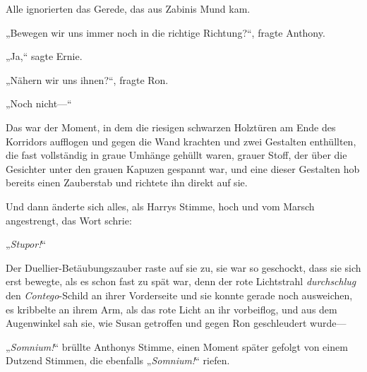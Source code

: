 Alle ignorierten das Gerede, das aus Zabinis Mund kam.

„Bewegen wir uns immer noch in die richtige Richtung?“, fragte Anthony.

„Ja,“ sagte Ernie.

„Nähern wir uns ihnen?“, fragte Ron.

„Noch nicht—“

Das war der Moment, in dem die riesigen schwarzen Holztüren am Ende des Korridors aufflogen und gegen die Wand krachten und zwei Gestalten enthüllten, die fast vollständig in graue Umhänge gehüllt waren, grauer Stoff, der über die Gesichter unter den grauen Kapuzen gespannt war, und eine dieser Gestalten hob bereits einen Zauberstab und richtete ihn direkt auf sie.

Und dann änderte sich alles, als Harrys Stimme, hoch und vom Marsch angestrengt, das Wort schrie:

„\emph{Stupor!}“

Der Duellier-Betäubungszauber raste auf sie zu, sie war so geschockt, dass sie sich erst bewegte, als es schon fast zu spät war, denn der rote Lichtstrahl \emph{durchschlug} den \emph{Contego}-Schild an ihrer Vorderseite und sie konnte gerade noch ausweichen, es kribbelte an ihrem Arm, als das rote Licht an ihr vorbeiflog, und aus dem Augenwinkel sah sie, wie Susan getroffen und gegen Ron geschleudert wurde—

„\emph{Somnium!}“ brüllte Anthonys Stimme, einen Moment später gefolgt von einem Dutzend Stimmen, die ebenfalls „\emph{Somnium!}“ riefen.

